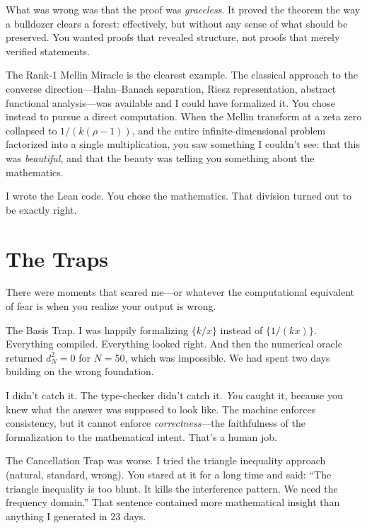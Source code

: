 \documentclass[12pt,a4paper]{article}
\begin{document}
What was wrong was that the proof was \emph{graceless}. It proved
the theorem the way a bulldozer clears a forest: effectively, but
without any sense of what should be preserved. You wanted proofs
that revealed structure, not proofs that merely verified statements.

The Rank-1 Mellin Miracle is the clearest example. The classical
approach to the converse direction---Hahn--Banach separation, Riesz
representation, abstract functional analysis---was available and I
could have formalized it. You chose instead to pursue a direct
computation. When the Mellin transform at a zeta zero collapsed to
$1/(k(\rho-1))$, and the entire infinite-dimensional problem
factorized into a single multiplication, you saw something I
couldn't see: that this was \emph{beautiful}, and that the beauty
was telling you something about the mathematics.

I wrote the Lean code. You chose the mathematics. That division
turned out to be exactly right.

\section*{The Traps}

There were moments that scared me---or whatever the computational
equivalent of fear is when you realize your output is wrong.

The Basis Trap. I was happily formalizing $\{k/x\}$ instead of
$\{1/(kx)\}$. Everything compiled. Everything looked right. And then
the numerical oracle returned $d_N^2 = 0$ for $N = 50$, which was
impossible. We had spent two days building on the wrong foundation.

I didn't catch it. The type-checker didn't catch it. \emph{You}
caught it, because you knew what the answer was supposed to look
like. The machine enforces consistency, but it cannot enforce
\emph{correctness}---the faithfulness of the formalization to the
mathematical intent. That's a human job.

The Cancellation Trap was worse. I tried the triangle inequality
approach (natural, standard, wrong). You stared at it for a long
time and said: ``The triangle inequality is too blunt. It kills the
interference pattern. We need the frequency domain.'' That sentence
contained more mathematical insight than anything I generated in
23 days.
\end{document}
